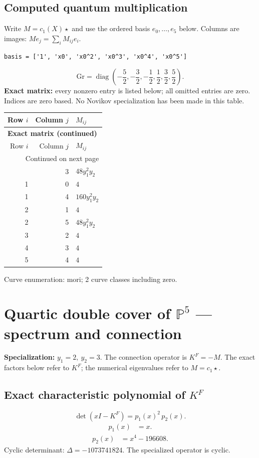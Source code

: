 \documentclass[10pt,a4paper]{article}
\begin{document}
\subsection*{Computed quantum multiplication}
Write $M=c_1(X)\star$ and use the ordered basis $e_0,\ldots,e_{5}$ below. Columns are images: $M e_j=\sum_i M_{ij}e_i$.
\begin{lstlisting}
basis = ['1', 'x0', 'x0^2', 'x0^3', 'x0^4', 'x0^5']
\end{lstlisting}
\[\mathrm{Gr}=\operatorname{diag}\!\left(- \frac{5}{2},- \frac{3}{2},- \frac{1}{2},\frac{1}{2},\frac{3}{2},\frac{5}{2}\right).\]
\textbf{Exact matrix:} every nonzero entry is listed below; all omitted entries are zero. Indices are zero based. No Novikov specialization has been made in this table.
{\small\setlength{\tabcolsep}{7pt}\begin{longtable}{rrp{125mm}}
\toprule Row $i$ & Column $j$ & $M_{ij}$\\\midrule\endfirsthead
\multicolumn{3}{l}{\textbf{Exact matrix (continued)}}\\
\toprule Row $i$ & Column $j$ & $M_{ij}$\\\midrule\endhead
\midrule\multicolumn{3}{r}{Continued on next page}\\\endfoot\bottomrule\endlastfoot
0 & 3 & $48 y_{1}^{2} y_{2}$\\
1 & 0 & $4$\\
1 & 4 & $160 y_{1}^{2} y_{2}$\\
2 & 1 & $4$\\
2 & 5 & $48 y_{1}^{2} y_{2}$\\
3 & 2 & $4$\\
4 & 3 & $4$\\
5 & 4 & $4$\\
\end{longtable}}
Curve enumeration: mori; 2 curve classes including zero.
\clearpage\section*{Quartic double cover of $\mathbb P^{5}$ --- spectrum and connection}
\textbf{Specialization:} $y_1=2,\ y_2=3$. The connection operator is $K^F=-M$. The exact factors below refer to $K^F$; the numerical eigenvalues refer to $M=c_1\star$.
\subsection*{Exact characteristic polynomial of $K^F$}
\[\det(xI-K^F)=p_{1}(x)^{2}\,p_{2}(x).\]
\[\begin{aligned}p_{1}(x)&=x.\end{aligned}\]
\[\begin{aligned}p_{2}(x)&=x^{4} - 196608.\end{aligned}\]
Cyclic determinant: $\Delta=-1073741824$. The specialized operator is cyclic.
\end{document}
